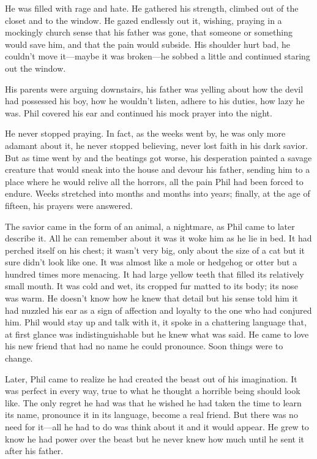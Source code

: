 He was filled with rage and hate. He gathered his strength, climbed out
of the closet and to the window. He gazed endlessly out it, wishing,
praying in a mockingly church sense that his father was gone, that
someone or something would save him, and that the pain would subside.
His shoulder hurt bad, he couldn't move it---maybe it was broken---he
sobbed a little and continued staring out the window.

His parents were arguing downstairs, his father was yelling about how
the devil had possessed his boy, how he wouldn't listen, adhere to his
duties, how lazy he was. Phil covered his ear and continued his mock
prayer into the night.

He never stopped praying. In fact, as the weeks went by, he was only
more adamant about it, he never stopped believing, never lost faith in
his dark savior. But as time went by and the beatings got worse, his
desperation painted a savage creature that would sneak into the house
and devour his father, sending him to a place where he would relive all
the horrors, all the pain Phil had been forced to endure. Weeks
stretched into months and months into years; finally, at the age of
fifteen, his prayers were answered.

The savior came in the form of an animal, a nightmare, as Phil came to
later describe it. All he can remember about it was it woke him as he
lie in bed. It had perched itself on his chest; it wasn't very big, only
about the size of a cat but it sure didn't look like one. It was almost
like a mole or hedgehog or otter but a hundred times more menacing. It
had large yellow teeth that filled its relatively small mouth. It was
cold and wet, its cropped fur matted to its body; its nose was warm. He
doesn't know how he knew that detail but his sense told him it had
nuzzled his ear as a sign of affection and loyalty to the one who had
conjured him. Phil would stay up and talk with it, it spoke in a
chattering language that, at first glance was indistinguishable but he
knew what was said. He came to love his new friend that had no name he
could pronounce. Soon things were to change.

Later, Phil came to realize he had created the beast out of his
imagination. It was perfect in every way, true to what he thought a
horrible being should look like. The only regret he had was that he
wished he had taken the time to learn its name, pronounce it in its
language, become a real friend. But there was no need for it---all he
had to do was think about it and it would appear. He grew to know he had
power over the beast but he never knew how much until he sent it after
his father.

